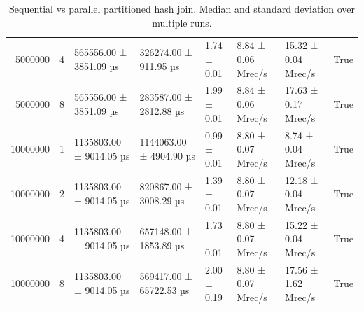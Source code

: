 \begin{table}[htbp]
{\begin{tabular}{rrlllllr}
5000000 & 4 & 565556.00 ± 3851.09 µs & 326274.00 ± 911.95 µs & 1.74 ± 0.01 & 8.84 ± 0.06 Mrec/s & 15.32 ± 0.04 Mrec/s & True \\
5000000 & 8 & 565556.00 ± 3851.09 µs & 283587.00 ± 2812.88 µs & 1.99 ± 0.01 & 8.84 ± 0.06 Mrec/s & 17.63 ± 0.17 Mrec/s & True \\
10000000 & 1 & 1135803.00 ± 9014.05 µs & 1144063.00 ± 4904.90 µs & 0.99 ± 0.01 & 8.80 ± 0.07 Mrec/s & 8.74 ± 0.04 Mrec/s & True \\
10000000 & 2 & 1135803.00 ± 9014.05 µs & 820867.00 ± 3008.29 µs & 1.39 ± 0.01 & 8.80 ± 0.07 Mrec/s & 12.18 ± 0.04 Mrec/s & True \\
10000000 & 4 & 1135803.00 ± 9014.05 µs & 657148.00 ± 1853.89 µs & 1.73 ± 0.01 & 8.80 ± 0.07 Mrec/s & 15.22 ± 0.04 Mrec/s & True \\
10000000 & 8 & 1135803.00 ± 9014.05 µs & 569417.00 ± 65722.53 µs & 2.00 ± 0.19 & 8.80 ± 0.07 Mrec/s & 17.56 ± 1.62 Mrec/s & True \\
\bottomrule
\end{tabular}
%
}
\caption{Sequential vs parallel partitioned hash join. Median and standard deviation over multiple runs.}
\label{tab:seq-par-performance}
\end{table}
